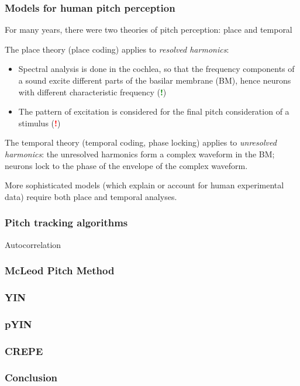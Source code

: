 \documentclass{beamer}
\begin{document}
\begin{frame}
\frametitle{Models for human pitch perception}
For many years, there were two theories of pitch perception: place and temporal

The place theory (place coding) applies to \textit{resolved harmonics}:
\begin{itemize}
	\item
		Spectral analysis is done in the cochlea, so that the frequency components of a sound excite different parts of the basilar membrane (BM), hence neurons with different characteristic frequency (\textcolor{green}{\textbf{!}})
	\item
		The pattern of excitation is considered for the final pitch consideration of a stimulus (\textcolor{red}{\textbf{!}})
\end{itemize}

The temporal theory (temporal coding, phase locking) applies to \textit{unresolved harmonics}: the unresolved harmonics form a complex waveform in the BM; neurons lock to the phase of the envelope of the complex waveform.

More sophisticated models (which explain or account for human experimental data) require both place and temporal analyses.
\end{frame}


\begin{frame}
	\frametitle{Pitch tracking algorithms}
Autocorrelation
\end{frame}

\begin{frame}
	\frametitle{McLeod Pitch Method}
\end{frame}

\begin{frame}
	\frametitle{YIN}
\end{frame}

\begin{frame}
	\frametitle{pYIN}
\end{frame}

\begin{frame}
	\frametitle{CREPE}
\end{frame}

\begin{frame}
	\frametitle{Conclusion}
\end{frame}
\end{document}
